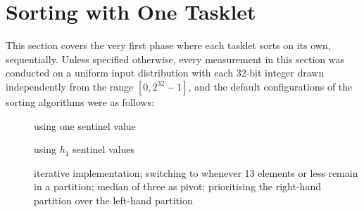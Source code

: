 \section{Sorting with One Tasklet}

This section covers the very first phase where each tasklet sorts on its own, \ie{} sequentially.
Unless specified otherwise, every measurement in this section was conducted on a uniform input distribution with each 32-bit integer drawn independently from the range \([0, 2^{32} - 1]\), and the default configurations of the sorting algorithms were as follows:
\begin{description}
	\item[\IS{}]
	using one sentinel value

	\item[\ShS{}]
	using \(h_1\) sentinel values

	\item[\QS{}]
	iterative implementation;
	switching to \IS{} whenever 13 elements or less remain in a partition;
	median of three as pivot;
	prioritising the right-hand partition over the left-hand partition
\end{description}





